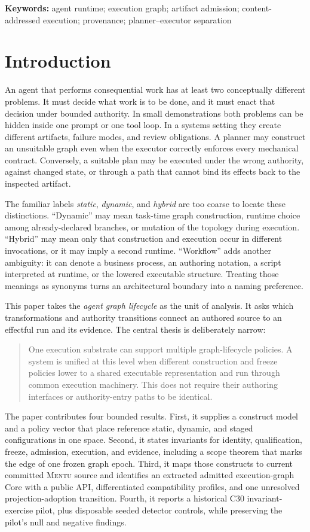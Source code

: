 \documentclass[11pt]{article}
\newcommand{\mentu}{\textsc{Mentu}}
\begin{document}
\textbf{Keywords:} agent runtime; execution graph; artifact admission;
content-addressed execution; provenance; planner--executor separation

\section{Introduction}

An agent that performs consequential work has at least two conceptually
different problems.  It must decide what work is to be done, and it must enact
that decision under bounded authority.  In small demonstrations both problems
can be hidden inside one prompt or one tool loop.  In a systems setting they
create different artifacts, failure modes, and review obligations.  A planner
may construct an unsuitable graph even when the executor correctly enforces
every mechanical contract.  Conversely, a suitable plan may be executed under
the wrong authority, against changed state, or through a path that cannot bind
its effects back to the inspected artifact.

The familiar labels \emph{static}, \emph{dynamic}, and \emph{hybrid} are too
coarse to locate these distinctions.  ``Dynamic'' may mean task-time graph
construction, runtime choice among already-declared branches, or mutation of
the topology during execution.  ``Hybrid'' may mean only that construction and
execution occur in different invocations, or it may imply a second runtime.
``Workflow'' adds another ambiguity: it can denote a business process, an
authoring notation, a script interpreted at runtime, or the lowered executable
structure.  Treating those meanings as synonyms turns an architectural
boundary into a naming preference.

This paper takes the \emph{agent graph lifecycle} as the unit of analysis.  It
asks which transformations and authority transitions connect an authored
source to an effectful run and its evidence.  The central thesis is deliberately
narrow:

\begin{quote}
One execution substrate can support multiple graph-lifecycle policies.  A
system is unified at this level when different construction and freeze policies
lower to a shared executable representation and run through common execution
machinery.  This does not require their authoring interfaces or authority-entry
paths to be identical.
\end{quote}

The paper contributes four bounded results.  First, it supplies a construct
model and a policy vector that place reference static, dynamic, and staged
configurations in one space.  Second, it states invariants for identity,
qualification, freeze, admission, execution, and evidence, including a
scope theorem that marks the edge of one frozen graph epoch. Third, it maps those
constructs to current committed \mentu{} source and identifies an extracted
admitted execution-graph Core with a public API, differentiated compatibility
profiles, and one unresolved projection-adoption transition. Fourth, it
reports a historical C30 invariant-exercise pilot, plus disposable seeded
detector controls, while preserving the pilot's null and negative findings.
\end{document}
